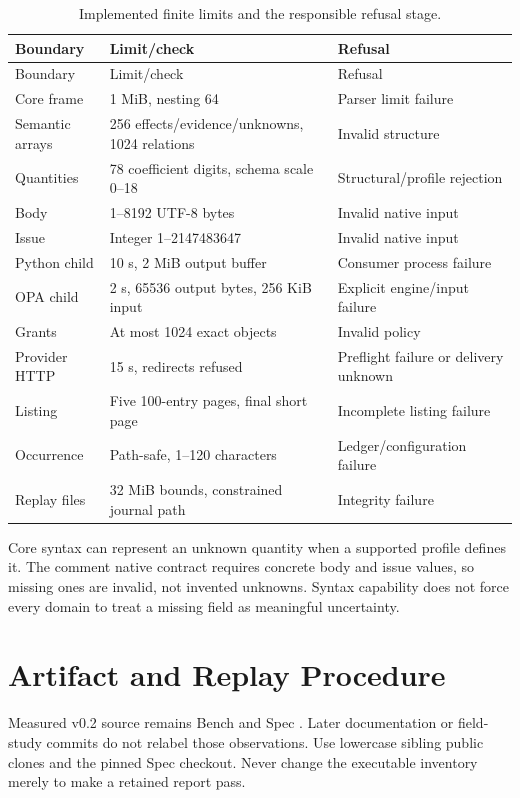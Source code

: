 \documentclass[11pt,letterpaper]{article}
\newcommand{\code}[1]{\texttt{\detokenize{#1}}}
\begin{document}
\begin{longtable}{@{}L{.22\linewidth}L{.39\linewidth}L{.32\linewidth}@{}}
\caption{Implemented finite limits and the responsible refusal stage.}
\label{tab:limits}\\
\toprule Boundary & Limit/check & Refusal \\ \midrule
\endfirsthead
\toprule Boundary & Limit/check & Refusal \\ \midrule
\endhead
Core frame & 1 MiB, nesting 64 & Parser limit failure \\
Semantic arrays & 256 effects/evidence/unknowns, 1024 relations & Invalid structure \\
Quantities & 78 coefficient digits, schema scale 0--18 & Structural/profile rejection \\
Body & 1--8192 UTF-8 bytes & Invalid native input \\
Issue & Integer 1--2147483647 & Invalid native input \\
Python child & 10 s, 2 MiB output buffer & Consumer process failure \\
OPA child & 2 s, 65536 output bytes, 256 KiB input & Explicit engine/input failure \\
Grants & At most 1024 exact objects & Invalid policy \\
Provider HTTP & 15 s, redirects refused & Preflight failure or delivery unknown \\
Listing & Five 100-entry pages, final short page & Incomplete listing failure \\
Occurrence & Path-safe, 1--120 characters & Ledger/configuration failure \\
Replay files & 32 MiB bounds, constrained journal path & Integrity failure \\
\bottomrule
\end{longtable}

Core syntax can represent an unknown quantity when a supported profile defines
it. The comment native contract requires concrete body and issue values, so
missing ones are invalid, not invented unknowns. Syntax capability does not
force every domain to treat a missing field as meaningful uncertainty.

\section{Artifact and Replay Procedure}

Measured v0.2 source remains Bench
\href{https://github.com/OndCo/Action-Effect-Bench/commit/9f638df994504ba6f5d82c0b5409922a0be7a72e}{\code{9f638df}}
and Spec
\href{https://github.com/OndCo/Action-Effect-Spec/commit/a9b86f4b529a5e330c2a9bf1b8c4c259a7b36e40}{\code{a9b86f4}}.
Later documentation or field-study commits do not relabel those observations.
Use lowercase sibling public clones and the pinned Spec checkout. Never change
the executable inventory merely to make a retained report pass.
\end{document}
